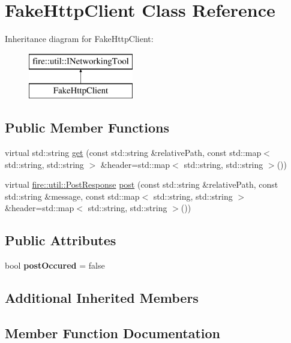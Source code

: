 \hypertarget{a01224}{}\section{Fake\+Http\+Client Class Reference}
\label{a01224}
Inheritance diagram for Fake\+Http\+Client\+:\begin{figure}[H]
\begin{center}
\leavevmode
\includegraphics[height=2.000000cm]{a01224}
\end{center}
\end{figure}
\subsection*{Public Member Functions}
\begin{DoxyCompactItemize}
\item 
virtual std\+::string \hyperlink{a01224_a1bc1c2f1b3a0efb383aabb5a3a8080e6}{get} (const std\+::string \&relative\+Path, const std\+::map$<$ std\+::string, std\+::string $>$ \&header=std\+::map$<$ std\+::string, std\+::string $>$())
\item 
virtual \hyperlink{a01972}{fire\+::util\+::\+Post\+Response} \hyperlink{a01224_ae5364b5e675139717fca7b8add4226da}{post} (const std\+::string \&relative\+Path, const std\+::string \&message, const std\+::map$<$ std\+::string, std\+::string $>$ \&header=std\+::map$<$ std\+::string, std\+::string $>$())
\end{DoxyCompactItemize}
\subsection*{Public Attributes}
\begin{DoxyCompactItemize}
\item 
\mbox{\label{a01224_aa4f56c4906c5c5654f05778b97860441}} 
bool {\bfseries post\+Occured} = false
\end{DoxyCompactItemize}
\subsection*{Additional Inherited Members}


\subsection{Member Function Documentation}
\mbox{\label{a01224_a1bc1c2f1b3a0efb383aabb5a3a8080e6}} 
